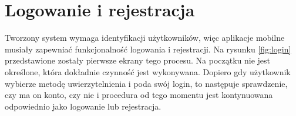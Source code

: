 \section{Logowanie i rejestracja}

Tworzony system wymaga identyfikacji użytkowników, więc aplikacje mobilne musiały zapewniać funkcjonalność logowania i rejestracji. 
Na rysunku \ref{fig:login} przedstawione zostały pierwsze ekrany tego procesu. Na początku nie jest określone, która dokładnie czynność jest wykonywana. Dopiero gdy użytkownik wybierze metodę uwierzytelnienia i poda swój login, to następuje sprawdzenie, czy ma on konto, czy nie i procedura od tego momentu jest kontynuowana odpowiednio jako logowanie lub rejestracja.

\begin{figure}[ht]
  \centering
  \begin{subfigure}[t]{0.33\textwidth}
    \centering

\end{subfigure}
\end{figure}
